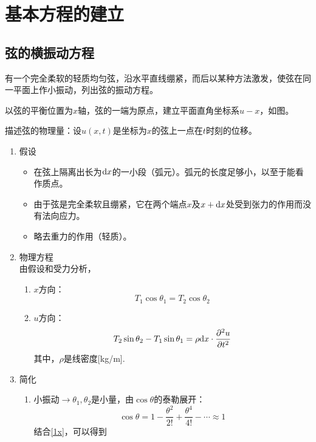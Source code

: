 \chapter{基本方程的建立}
\thispagestyle{empty}
\section{弦的横振动方程}
有一个完全柔软的轻质均匀弦，沿水平直线绷紧，而后以某种方法激发，使弦在同一平面上作小振动，列出弦的振动方程。

以弦的平衡位置为$x$轴，弦的一端为原点，建立平面直角坐标系$u-x$，如图。

描述弦的物理量：设$u(x,t)$是坐标为$x$的弦上一点在$t$时刻的位移。
\begin{enumerate}[\hspace*{3em} 1.]
		\item 假设
	\begin{itemize}
		\item 在弦上隔离出长为${\rm{d}} x$的一小段（弧元）。弧元的长度足够小，以至于能看作质点。
		\item 由于弦是完全柔软且绷紧，它在两个端点$x$及$x + {\rm{d}} x$处受到张力的作用而没有法向应力。
		\item 略去重力的作用（轻质）。
	\end{itemize}
	\item 物理方程\\
	由假设和受力分析，
	\begin{enumerate}[]
		\item $x$方向：
		\begin{equation}
			T_1 \cos \theta_1 = T_2 \cos\theta_2
			\label{1x}
		\end{equation}
		\item $u$方向：
		\begin{equation}
			T_2 \sin \theta_2 - T_1 \sin\theta_1 = \rho {\rm{d}} x \cdot \frac{\partial^2 u}{\partial t^2}
			\label{1u}
		\end{equation}
		其中，$\rho$是线密度[kg/m].
	\end{enumerate}
	\item 简化
	\begin{enumerate}[]
		\item 小振动$\longrightarrow \theta_1, \theta_2$是小量，由$\cos \theta$的泰勒展开：
		\begin{equation}
			\cos \theta = 1 - \frac{\theta^2}{2!} + \frac{\theta^4}{4!}- \cdots \approx 1
		\end{equation}
		结合\eqref{1x}，可以得到
		\begin{equation}

\end{equation}
\end{enumerate}
\end{enumerate}
